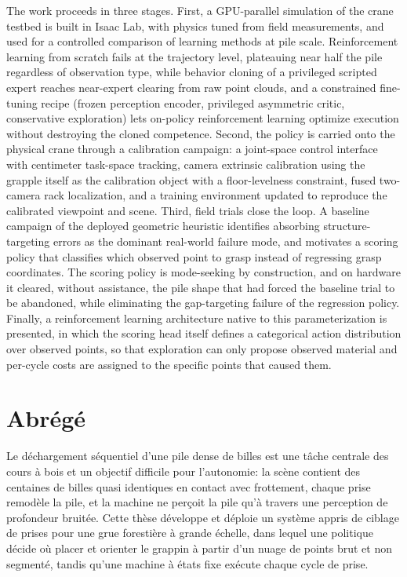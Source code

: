 \documentclass[12pt, letterpaper]{report}
\begin{document}
The work proceeds in three stages. First, a GPU-parallel simulation of the
crane testbed is built in Isaac Lab, with physics tuned from field
measurements, and used for a controlled comparison of learning methods at
pile scale. Reinforcement learning from scratch fails at the trajectory
level, plateauing near half the pile regardless of observation type, while
behavior cloning of a privileged scripted expert reaches near-expert
clearing from raw point clouds, and a constrained fine-tuning recipe (frozen
perception encoder, privileged asymmetric critic, conservative exploration)
lets on-policy reinforcement learning optimize execution without destroying
the cloned competence. Second, the policy is carried onto the physical
crane through a calibration campaign: a joint-space control interface with
centimeter task-space tracking, camera extrinsic calibration using the
grapple itself as the calibration object with a floor-levelness constraint,
fused two-camera rack localization, and a training environment updated to
reproduce the calibrated viewpoint and scene. Third, field trials close the
loop. A baseline campaign of the deployed geometric heuristic identifies
absorbing structure-targeting errors as the dominant real-world failure
mode, and motivates a scoring policy that classifies which observed point to
grasp instead of regressing grasp coordinates. The scoring policy is
mode-seeking by construction, and on hardware it cleared, without
assistance, the pile shape that had forced the baseline trial to be
abandoned, while eliminating the gap-targeting failure of the regression
policy. Finally, a reinforcement learning architecture native to this
parameterization is presented, in which the scoring head itself defines a
categorical action distribution over observed points, so that exploration
can only propose observed material and per-cycle costs are assigned to the
specific points that caused them.

\chapter*{Abr\'eg\'e}
\label{chap:frAbstract}

Le d\'echargement s\'equentiel d'une pile dense de billes est une t\^ache
centrale des cours \`a bois et un objectif difficile pour l'autonomie: la
sc\`ene contient des centaines de billes quasi identiques en contact avec
frottement, chaque prise remodèle la pile, et la machine ne per\c{c}oit la
pile qu'\`a travers une perception de profondeur bruit\'ee. Cette th\`ese
d\'eveloppe et d\'eploie un syst\`eme appris de ciblage de prises pour une
grue foresti\`ere \`a grande \'echelle, dans lequel une politique d\'ecide
o\`u placer et orienter le grappin \`a partir d'un nuage de points brut et
non segment\'e, tandis qu'une machine \`a \'etats fixe ex\'ecute chaque
cycle de prise.
\end{document}
